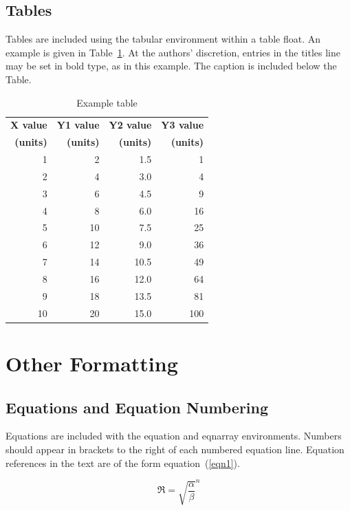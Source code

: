 \documentclass[10pt,a4paper]{article}
\begin{document}
\subsection{Tables}
Tables are included using the tabular environment within a table float. An example is given in Table~\ref{tab1:egTable}. At the authors' discretion, entries in the titles line may be set in bold type, as in this example. The caption is included below the Table.

\begin{table}[h]
\begin{center}
\begin{tabular}{|r|rrr|}
\hline
\textbf{X value} & \textbf{Y1 value} & \textbf{Y2 value} & \textbf{Y3 value} \\
\textbf{(units)} & \textbf{(units)} & \textbf{(units)} & \textbf{(units)} \\
\hline
1 & 2 & 1.5 & 1  \\
2 & 4 & 3.0 & 4  \\
3 & 6 & 4.5 & 9 \\
4 & 8 & 6.0 & 16 \\
5 & 10 & 7.5 & 25 \\
6 & 12 & 9.0 & 36 \\
7 & 14 & 10.5 & 49 \\
8 & 16 & 12.0 & 64 \\
9 & 18 & 13.5 & 81 \\
10 & 20 & 15.0 & 100 \\
\hline
\end{tabular}
\caption{\label{tab1:egTable} Example table}
\end{center}
\end{table}

\section{Other Formatting}

\subsection{Equations and Equation Numbering}

Equations are included with the equation and eqnarray environments. Numbers should appear in brackets to the right of each numbered equation line. Equation references in the text are of the form equation~(\ref{eqn1}).

\begin{equation}
\Re = \sqrt{\frac{\alpha}{\beta}}^n
\label{eqn1}
\end{equation}
\end{document}
